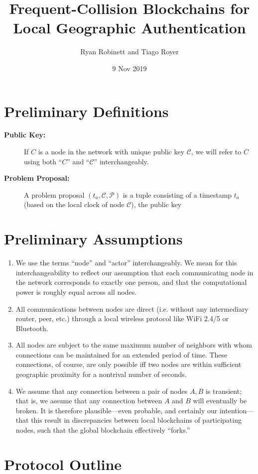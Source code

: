 \documentclass{article}
\title{Frequent-Collision Blockchains for Local Geographic Authentication}
\author{Ryan Robinett and Tiago Royer}
\date{9 Nov 2019}
\begin{document}
\maketitle

\section*{Preliminary Definitions}
\begin{description}
	\item[\textbf{Public Key:}] If $C$ is a node in the network with unique public key
		$\mathcal{C}$, we will refer to $C$ using both ``$C$'' and ``$\mathcal{C}$''
		interchangeably.
	\item[\textbf{Problem Proposal:}] A problem proposal $(t_a,\mathcal{C},\mathcal{P})$
		is a tuple consisting of a timestamp $t_a$ (based on the local clock
		of node $\mathcal{C}$), the public key 
\end{description}

\section*{Preliminary Assumptions}
\begin{enumerate}
	\item We use the terms ``node'' and ``actor'' interchangeably. We mean for this
		interchangeability to reflect our assumption that each communicating
		node in the network corresponds to exactly one person, and that the
		computational power is roughly equal across all nodes.
	\item All communications between nodes are direct (i.e. without any intermediary
		router, peer, etc.) through a local wireless protocol like WiFi 2.4/5 or
		Bluetooth.
	\item All nodes are subject to the same maximum number of neighbors with whom
		connections can be maintained for an extended period of time. These
		connections, of course, are only possible iff two nodes are within
		sufficient geographic proximity for a nontrival number of seconds.
	\item We assume that any connection between a pair of nodes $A,B$ is transient;
		that is, we assume that any connection between $A$ and $B$ will eventually
		be broken. It is therefore plausible---even probable, and certainly our
		intention---that this result in discrepancies between local blockchains
		of participating nodes, such that the global blockchain effectively
		``forks.''
\end{enumerate}

\section*{Protocol Outline}
\end{document}
